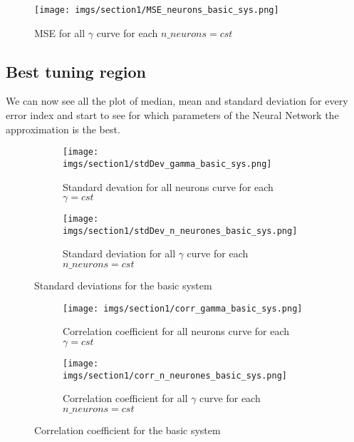 \begin{figure}
    \centering
    \texttt{[image: imgs/section1/MSE\_neurons\_basic\_sys.png]}
    \caption{MSE for all \(\gamma\) curve for each \(n\_neurons = cst\)}
    \label{fig:MSE_neurons}
\end{figure}


\subsection{Best tuning region}
We can now see all the plot of median, mean and standard deviation for every error index %
and start to see for which parameters of the Neural Network the approximation is the best. %

\begin{figure}[htbp]
    \centering
    \begin{subfigure}{0.49\textwidth}
        \centering
        \texttt{[image: imgs/section1/stdDev\_gamma\_basic\_sys.png]}
        \caption{Standard devation for all neurons curve for each \(\gamma = cst\)}
        \label{fig:stdDev_gamma_basic_sys}
    \end{subfigure}
    \hfill
    \begin{subfigure}{0.49\textwidth}
        \centering
        \texttt{[image: imgs/section1/stdDev\_n\_neurones\_basic\_sys.png]}
        \caption{Standard deviation for all \(\gamma\) curve for each \(n\_neurons = cst\)}
        \label{fig:stdDev_n_neurones_basic_sys}
    \end{subfigure}
    \caption{Standard deviations for the basic system}
    \label{fig:Standard_deviations_for_the_basic_system}
\end{figure}

\begin{figure}[htbp]
    \centering
    \begin{subfigure}{0.49\textwidth}
        \centering
        \texttt{[image: imgs/section1/corr\_gamma\_basic\_sys.png]}
        \caption{Correlation coefficient for all neurons curve for each \(\gamma = cst\)}
        \label{fig:corr_gamma_basic_sys}
    \end{subfigure}
    \hfill
    \begin{subfigure}{0.49\textwidth}
        \centering
        \texttt{[image: imgs/section1/corr\_n\_neurones\_basic\_sys.png]}
        \caption{Correlation coefficient for all \(\gamma\) curve for each \(n\_neurons = cst\)}
        \label{fig:corr_n_neurones_basic_sys}
    \end{subfigure}
    \caption{Correlation coefficient for the basic system}
    \label{fig:Correlation_coefficient_for_the_basic_system}
\end{figure}

